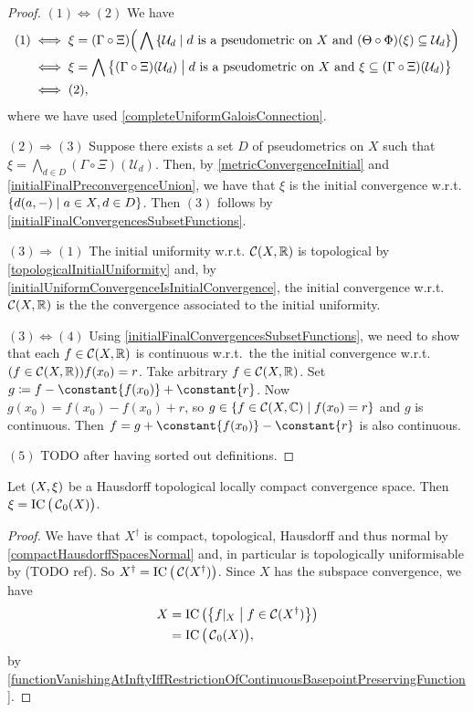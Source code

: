 \begin{proof}
$(1) \Leftrightarrow (2)$  We have
\begin{align*}
(1) &\iff \xi = (\Gamma \circ \Xi)\Big(\bigwedge \setbuilder{\mathcal{U}_d}{\text{$d$ is a pseudometric on $X$ and $(\Theta\circ \Phi)(\xi)\subseteq \mathcal{U}_d$}}\Big) \\
&\iff \xi = \bigwedge\setbuilder[\big]{(\Gamma \circ \Xi)(\mathcal{U}_d)}{\text{$d$ is a pseudometric on $X$ and $\xi\subseteq (\Gamma\circ \Xi)(\mathcal{U}_d)$}} \\
&\iff (2),
\end{align*}
where we have used \ref{completeUniformGaloisConnection}.

$(2) \Rightarrow (3)$ Suppose there exists a set $D$ of pseudometrics on $X$ such that $\xi = \bigwedge_{d\in D}(\Gamma\circ \Xi)(\mathcal{U}_d)$. Then, by \ref{metricConvergenceInitial} and \ref{initialFinalPreconvergenceUnion}, we have that $\xi$ is the initial convergence w.r.t.  $\setbuilder{d(a,-)}{a\in X, d\in D}$. Then $(3)$ follows by \ref{initialFinalConvergencesSubsetFunctions}. 

$(3) \Rightarrow (1)$ The initial uniformity w.r.t. $\operatorname{\mathcal{C}}(X,\mathbb{R})$ is topological by \ref{topologicalInitialUniformity} and, by \ref{initialUniformConvergenceIsInitialConvergence}, the initial convergence w.r.t. $\operatorname{\mathcal{C}}(X,\mathbb{R})$ is the the convergence associated to the initial uniformity.

$(3) \Leftrightarrow (4)$ Using \ref{initialFinalConvergencesSubsetFunctions}, we need to show that each $f\in \operatorname{\mathcal{C}}(X,\mathbb{R})$ is continuous w.r.t.\ the the initial convergence w.r.t. $\sSet{f \in \cont(X,\R)}{f(x_0) = r}$. Take arbitrary $f\in \operatorname{\mathcal{C}}(X, \mathbb{R})$. Set $g \defeq f - \constant{f(x_0)}+\constant{r}$. Now $g(x_0) = f(x_0) - f(x_0) + r$, so $g\in \setbuilder{f\in \cont(X,\C)}{f(x_0) = r}$ and $g$ is continuous. Then $f = g + \constant{f(x_0)}-\constant{r}$ is also continuous.

$(5)$ TODO after having sorted out definitions.
\end{proof}

\begin{lemma} \label{LCTopologicalHausdorffInitialConvergence}
Let $\sSet{X,\xi}$ be a Hausdorff topological locally compact convergence space. Then $\xi = \operatorname{IC}\big(\operatorname{\mathcal{C}}_0(X)\big)$.
\end{lemma}
\begin{proof}
We have that $X^\dagger$ is compact, topological, Hausdorff and thus normal by \ref{compactHausdorffSpacesNormal} and, in particular is topologically uniformisable by (TODO ref). So $X^\dagger = \operatorname{IC}\big(\operatorname{\mathcal{C}}(X^\dagger)\big)$. Since $X$ has the subspace convergence, we have
\begin{align*}
X &= \initialConv\big(\setbuilder{f|_X}{f\in \cont(X^\dagger)}\big) \\
&= \initialConv\big(\cont_0(X)\big),
\end{align*}
by \ref{functionVanishingAtInftyIffRestrictionOfContinuousBasepointPreservingFunction}.
\end{proof}

